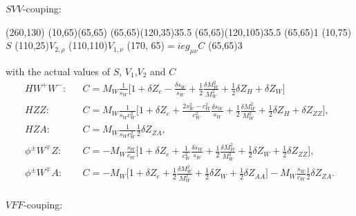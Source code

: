$SVV$-couping:

\begin{axopicture}(260,130) %
	\Line[dash](10,65)(65,65)
	\Photon(65,65)(120,35){3}{5.5}
	\Photon(65,65)(120,105){3}{5.5}
	\Vertex(65,65){1}		
	\Text(10,75){$S$}
	\Text(110,25){$V_{2,\rho}$}
	\Text(110,110){$V_{1,\nu}$}
	\Text(170, 65){$=ieg_{\mu\nu}C$}
	\Vertex(65,65){3}
\end{axopicture}
\newline with the actual values of $S$, $V_1$,$V_2$ and $C$
\begin{eqnarray}
HW^+W^-:&& C=M_W\frac{1}{s_W}\biggl[ 1+\delta Z_e-\frac{\delta s_W}{s_W}+\frac{1}{2}\frac{\delta M^2_W}{M_W^2}+\frac{1}{2}\delta Z_H+\delta Z_W \biggr]\nonumber\\
HZZ:&& C=M_W\frac{1}{s_Wc^2_W}\biggl[ 1+\delta Z_e+\frac{2s^2_W-c^2_W}{c^2_W}\frac{\delta s_W}{s_W}+\frac{1}{2}\frac{\delta M^2_W}{M_W^2}+\frac{1}{2}\delta Z_H+\delta Z_{ZZ} \biggr],\nonumber\\
HZA:&& C=M_W\frac{1}{s_Wc^2_W}\frac{1}{2}\delta Z_{ZA},\nonumber\\
\phi^\pm
W^\mp Z:&& C=-M_W\frac{s_W}{c_W}\biggl[ 1+\delta Z_e+\frac{1}{c^2_W}\frac{\delta s_W}{s_W}+\frac{1}{2}\frac{\delta M^2_W}{M_W^2}+\frac{1}{2}\delta Z_W+\frac{1}{2}\delta Z_{ZZ} \biggr],\nonumber\\
\phi^\pm W^\mp A:&& C=-M_W\biggl[ 1+\delta Z_e+\frac{1}{2}\frac{\delta M^2_W}{M_W^2}+\frac{1}{2}\delta Z_W+\frac{1}{2}\delta Z_{AA} \biggr]-M_W\frac{s_W}{c_W}\frac{1}{2}\delta Z_{ZA}.\nonumber\\
\end{eqnarray}

$VFF$-couping:


